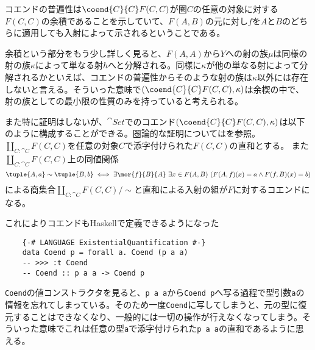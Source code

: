 \documentclass[uplatex,dvipdfmx]{jsarticle}
\newcommand{\pr}[1]{\colorbox[rgb]{0.9,0.9,0.9}{\lstinline{#1}}}
\begin{document}
\begin{define}[コエンド]
\begin{quote}
\begin{mydescription}
\begin{center}
        \end{center}
      \end{mydescription}
    \end{quote}
  \end{define}
  コエンドの普遍性は$\coend{C}{C} F(C,C)$が圏$C$の任意の対象に対する$F(C,C)$の余積であることを示していて、$F(A,B)$の元に対し$f$を$A$と$B$のどちらに適用しても入射によって示されるということである。
  
  余積という部分をもう少し詳しく見ると、$F(A,A)$から$Y$への射の族$\mu$は同様の射の族$\kappa$によって単なる射$h$へと分解される。同様に$\kappa$が他の単なる射によって分解されるかといえば、コエンドの普遍性からそのような射の族は$\kappa$以外には存在しないと言える。そういった意味で$(\coend{C}{C} F(C,C),\kappa)$は余楔の中で、射の族としての最小限の性質のみを持っていると考えられる。
  
  また特に証明はしないが、$\cat{Set}$でのコエンド$(\coend{C}{C}F(C,C),\kappa)$は以下のように構成することができる。圏論的な証明については\cite{coend_calculus}を参照。
  $\coprod_{C:\cat{C}} F(C,C)$を任意の対象$C$で添字付けられた$F(C,C)$の直和とする。
  また$\coprod_{C:\cat{C}} F(C,C)$上の同値関係\[\tuple{A,a}\sim\tuple{B,b}\iff \exists \mor{f}{B}{A}\ \exists x\in F(A,B)\ (F(A,f)(x) = a \land F(f,B)(x) = b)\]による商集合$\coprod_{C:\cat{C}} F(C,C)/\sim$と直和による入射の組が$F$に対するコエンドになる。

  これによりコエンドもHaskellで定義できるようになった
  \begin{lstlisting}
    {-# LANGUAGE ExistentialQuantification #-}
    data Coend p = forall a. Coend (p a a)
    -- >>> :t Coend
    -- Coend :: p a a -> Coend p
  \end{lstlisting}
  \pr{Coend}の値コンストラクタを見ると、\pr{p a a}から\pr{Coend p}へ写る過程で型引数\pr{a}の情報を忘れてしまっている。そのため一度\pr{Coend}に写してしまうと、元の型に復元することはできなくなり、一般的には一切の操作が行えなくなってしまう。そういった意味でこれは任意の型\pr{a}で添字付けられた\pr{p a a}の直和であるように思える。
\end{document}
